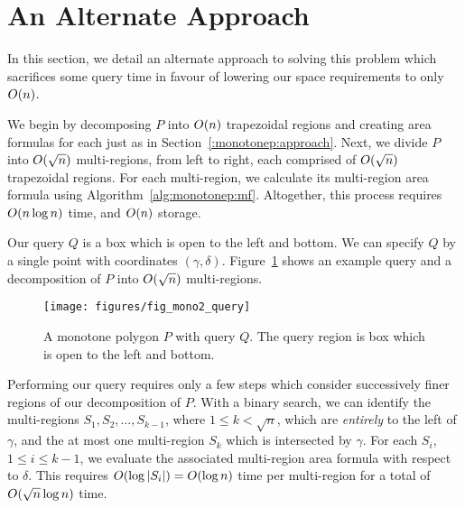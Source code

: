 \section{An Alternate Approach}
\label{:monotonep:alt}

In this section, we detail an alternate approach to solving this problem which sacrifices some query time in favour of lowering our space requirements to only $O\!\left(n\right)$.

We begin by decomposing $P$ into $O\!\left(n\right)$ trapezoidal regions and creating area formulas for each just as in Section~\ref{:monotonep:approach}. 
Next, we divide $P$ into $O\!\left(\sqrt{n}\right)$ multi-regions, from left to right, each comprised of $O\!\left(\sqrt{n}\right)$ trapezoidal regions.
For each multi-region, we calculate its multi-region area formula using Algorithm~\ref{alg:monotonep:mf}.  
Altogether, this process requires $O\!\left(n\log{n}\right)$ time, and $O\!\left(n\right)$ storage.

Our query $Q$ is a box which is open to the left and bottom.
We can specify $Q$ by a single point with coordinates $(\gamma, \delta)$.  
Figure~\ref{fig:mono2:query} shows an example query and a decomposition of $P$ into $O\!\left(\sqrt{n}\right)$ multi-regions.

\begin{figure}[t]
\begin{center}
  \texttt{[image: figures/fig\_mono2\_query]}
  \caption[An alternate query method for a monotone polygon.]{A monotone polygon $P$ with query $Q$. The query region is box which is open to the left and bottom.}
  \label{fig:mono2:query}
\end{center}
\end{figure}

Performing our query requires only a few steps which consider successively finer regions of our decomposition of $P$.
With a binary search, we can identify the multi-regions $S_1, S_2, \ldots, S_{k-1}$, where $1 \leq k < \sqrt{n}$, which are \emph{entirely} to the left of $\gamma$, and the at most one multi-region $S_{k}$ which is intersected by $\gamma$.  
For each $S_i$, $1 \leq i \leq k-1$, we evaluate the associated multi-region area formula with respect to $\delta$. 
This requires $O\!\left(\log{|S_i|}\right) = O\!\left(\log{n}\right)$ time per multi-region for a total of $O\!\left(\sqrt{n}\log{n}\right)$ time.

